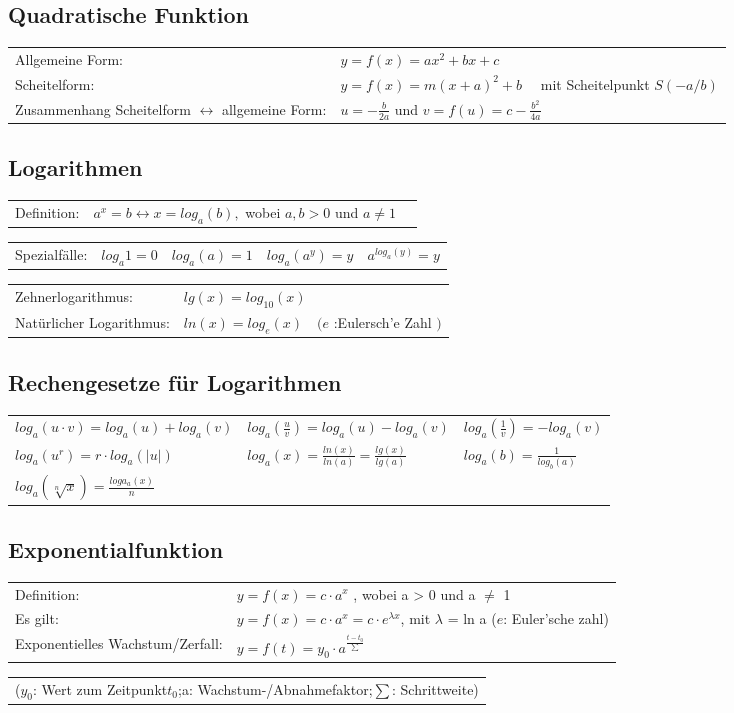 \subsection{Quadratische Funktion}
\begin{tabularx}{\columnwidth}{Xl}
	Allgemeine Form: & $ y=f(x)=ax^2+bx+c $
	\\
	Scheitelform: &$ y= f(x)=m(x+a)^2+b \quad$ mit Scheitelpunkt $ S(-a/b) $
	\\
	Zusammenhang Scheitelform $ \leftrightarrow $ allgemeine Form: & $ u= -\frac{b}{2a} $ und $ v = f(u)=c-\frac{b^2}{4a} $
\end{tabularx}

\subsection{Logarithmen}
\begin{tabularx}{\columnwidth}{XXl}
	Definition: & $a^x=b \leftrightarrow x=log_{a}(b),$ \; wobei\;  $a,b > 0 $ und $ a \neq 1$
\end{tabularx}
\begin{tabularx}{\columnwidth}{XXXXX}
	Spezialfälle:&$log_{a}1=0$&$log_{a}(a)=1$&$log_{a}(a^y)=y$&$a^{log_{a}(y)}=y$
\end{tabularx}
\begin{tabularx}{\columnwidth}{XX}
	Zehnerlogarithmus: & $ lg(x)=log_{10}(x) $
	\\
	Natürlicher Logarithmus:&$ ln(x)=log_{e}(x) \quad (e$ :Eulersch'e Zahl $) $
\end{tabularx}

\subsection{Rechengesetze für Logarithmen}
\begin{tabularx}{\columnwidth}{XXX}
	$ log_{a}(u\cdot v)=log_{a}(u)+log_{a}(v)$&$log_{a}(\frac{u}{v})=log_{a}(u)-log_{a}(v)$&$ log_a(\frac{1}{v})=-log_{a}(v)$
	\\
	$log_{a}(u^r)=r\cdot log_{a}(|u|)$&$ log_{a}(x)=\frac{ln(x)}{ln(a)}=\frac{lg(x)}{lg(a)}$&$ log_{a}(b)=\frac{1}{log_{b}(a)}$
	\\
	$log_{a}(\sqrt[n]{x})=\frac{loga_{a}(x)}{n}$
\end{tabularx}

\subsection{Exponentialfunktion}
\begin{tabularx}{\columnwidth}{Xl}
	Definition: & $ y=f(x)=c \cdot a^x$ , wobei a > 0 und a $ \neq $ 1
	\\
	Es gilt: &$ y=f(x)=c \cdot a^x = c \cdot e^{\lambda x}$, mit $ \lambda$ = ln a ($ e $: Euler'sche zahl)
	\\
	Exponentielles Wachstum/Zerfall: & $ y=f(t)=y_{0} \cdot a^{\frac{t-t_{0}}{\sum}} $
\end{tabularx}
\begin{tabularx}{\columnwidth}{X}
	($ y_{0} $: Wert zum Zeitpunkt$ t_{0} $;\quad a: Wachstum-/Abnahmefaktor;\quad $ \sum $: Schrittweite)

\end{tabularx}
